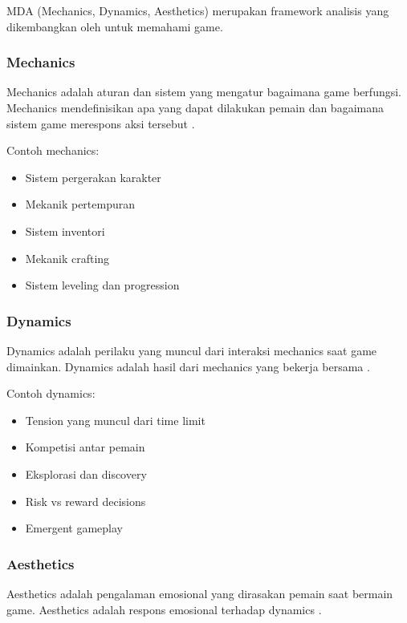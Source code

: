 MDA (Mechanics, Dynamics, Aesthetics) merupakan framework analisis yang dikembangkan oleh \cite{Hunicke2004} untuk memahami game.

\subsubsection{Mechanics}

\begin{definisi}[Mechanics]
Mechanics adalah aturan dan sistem yang mengatur bagaimana game berfungsi. Mechanics mendefinisikan apa yang dapat dilakukan pemain dan bagaimana sistem game merespons aksi tersebut \cite{Hunicke2004}.
\end{definisi}

Contoh mechanics:
\begin{itemize}
\item Sistem pergerakan karakter
\item Mekanik pertempuran
\item Sistem inventori
\item Mekanik crafting
\item Sistem leveling dan progression
\end{itemize}

\subsubsection{Dynamics}

\begin{definisi}[Dynamics]
Dynamics adalah perilaku yang muncul dari interaksi mechanics saat game dimainkan. Dynamics adalah hasil dari mechanics yang bekerja bersama \cite{Hunicke2004}.
\end{definisi}

Contoh dynamics:
\begin{itemize}
\item Tension yang muncul dari time limit
\item Kompetisi antar pemain
\item Eksplorasi dan discovery
\item Risk vs reward decisions
\item Emergent gameplay
\end{itemize}

\subsubsection{Aesthetics}

\begin{definisi}[Aesthetics]
Aesthetics adalah pengalaman emosional yang dirasakan pemain saat bermain game. Aesthetics adalah respons emosional terhadap dynamics \cite{Hunicke2004}.
\end{definisi}

